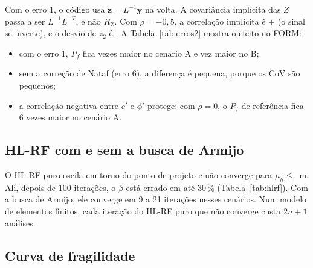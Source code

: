 \documentclass[11pt,a4paper]{article}
\begin{document}
Com o erro 1, o código usa $\bm z = L^{-1}\bm y$ na volta. A covariância implícita das $Z$ passa a ser $L^{-1}L^{-T}$,
e não $R_Z$. Com $\rho = -0{,}5$, a correlação implícita é $+$\pDoisRhoErro{} (o sinal se inverte), e o desvio de
$z_2$ é \pDoisDpErro{}. A Tabela~\ref{tab:erros2} mostra o efeito no FORM:
\begin{itemize}
  \item com o erro 1, $P_f$ fica \pDoisAErroL{} vezes maior no cenário A e \pDoisBErroL{} vez maior no B;
  \item sem a correção de Nataf (erro 6), a diferença é pequena, porque os CoV são pequenos;
  \item a correlação negativa entre $c'$ e $\phi'$ protege: com $\rho = 0$, o $P_f$ de referência fica 6 vezes maior
    no cenário A.
\end{itemize}

\begin{table}[H]
\centering\small
\caption{FORM com a transformação certa e com os erros do código original, e o caso independente.}
\label{tab:erros2}

\end{table}

\subsection{HL-RF com e sem a busca de Armijo}
\label{sec:armijo}

O HL-RF puro oscila em torno do ponto de projeto e não converge para $\mu_h \leq$ \pDoisNaoConvMax{}\,m. Ali, depois
de 100 iterações, o $\beta$ está errado em até 30\,\% (Tabela~\ref{tab:hlrf}). Com a busca de Armijo, ele converge em
9 a 21 iterações nesses cenários. Num modelo de elementos finitos, cada iteração do HL-RF puro que não converge custa $2n + 1$
análises.

\begin{table}[H]
\centering\small
\caption{O HL-RF puro e com a busca de Armijo ao longo dos cenários de chuva.}
\label{tab:hlrf}

\end{table}

\subsection{Curva de fragilidade}
\label{sec:fragilidade}
\end{document}
